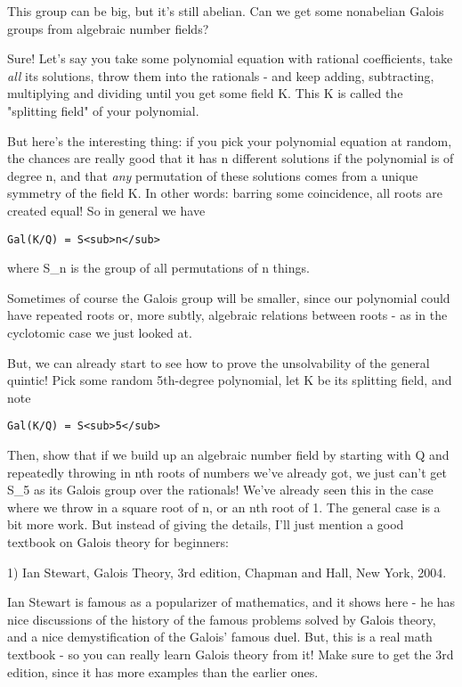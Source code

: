 This group can be big, but it's still abelian.  Can we get some nonabelian
Galois groups from algebraic number fields?

Sure!  Let's say you take some polynomial equation with rational coefficients, 
take \emph{all} its solutions, throw them into the rationals - and keep 
adding, 
subtracting, multiplying and dividing until you get some field K.  This K 
is called the "splitting field" of your polynomial.  

But here's the interesting thing: if you pick your polynomial equation at 
random, the chances are really good that it has n different solutions if 
the polynomial is of degree n, and that \emph{any} permutation of these 
solutions comes from a unique symmetry of the field K.  In other words:
barring some coincidence, all roots are created equal!  So in general we 
have

\begin{verbatim}
Gal(K/Q) = S<sub>n</sub>
\end{verbatim}
    
where S_{n} is the group of all permutations of n things.

Sometimes of course the Galois group will be smaller, since our polynomial
could have repeated roots or, more subtly, algebraic relations between
roots - as in the cyclotomic case we just looked at.  

But, we can already start to see how to prove the unsolvability of the 
general quintic!  Pick some random 5th-degree polynomial, let K be its
splitting field, and note

\begin{verbatim}
Gal(K/Q) = S<sub>5</sub>
\end{verbatim}
    
Then, show that if we build up an algebraic number field by starting
with Q and repeatedly throwing in nth roots of numbers we've already got, 
we just can't get S_{5} as its Galois group over the rationals!  We've 
already seen this in the case where we throw in a square root of n, or 
an nth root of 1.  The general case is a bit more work.  But instead of 
giving the details, I'll just mention a good textbook on Galois theory for 
beginners:

1) Ian Stewart, Galois Theory, 3rd edition, Chapman and Hall, New York, 
2004.

Ian Stewart is famous as a popularizer of mathematics, and it shows
here - he has nice discussions of the history of the famous problems
solved by Galois theory, and a nice demystification of the Galois'
famous duel.  But, this is a real math textbook - so you can really 
learn Galois theory from it!  Make sure to get the 3rd edition, since
it has more examples than the earlier ones.

